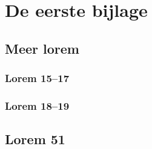 \chapter{De eerste bijlage}
\label{app:A}
%

\section{Meer lorem}
\lipsum[50]

\subsection{Lorem 15--17}
\lipsum[15-17]

\subsection{Lorem 18--19}
\lipsum[18-19]

\section{Lorem 51}
\lipsum[51]

